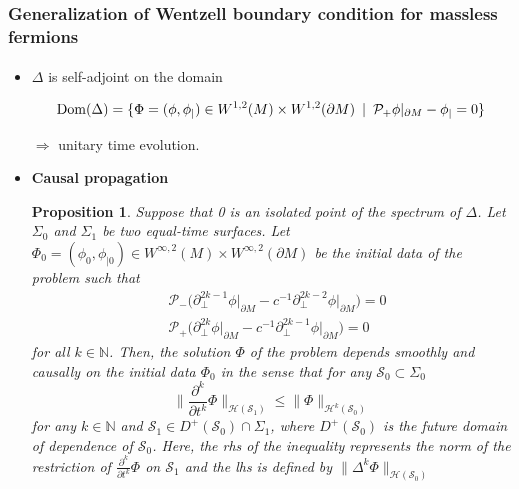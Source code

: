 \documentclass[english]{beamer}
\newcommand{\dom}{\mathrm{Dom}}
\newtheorem{proposition}{Proposition}
\begin{document}
\begin{frame}[shrink=40]
\frametitle{\small{Generalization of Wentzell boundary condition for massless fermions}}
\framesubtitle{}

\begin{itemize}

\item<1-> $\Delta$ is self-adjoint on the domain

\begin{equation*}
\dom( \Delta) = \{ \Phi = (\phi, \phi_|) \in W^{1,2}(M)\times W^{1,2}(
\partial M) \enskip | \enskip \mathcal{P}_+\phi \vert_{\partial M} - \phi_| = 0 \} 
\end{equation*}  

$\Rightarrow$ unitary time evolution.
\newline

\item<2-> \textbf{Causal propagation}\\

\begin{proposition}\label{wen-prop-causal}
Suppose that 0 is an isolated point of the spectrum of $\Delta$. 
Let $\Sigma_0$ and $\Sigma_1$ be two equal-time surfaces.
Let $\Phi_0 = (\phi_0, \phi_{|0})\in W^{\infty,2}(M)\times W^{\infty,2}(\partial M)$ be the initial data of the problem such that
\begin{equation}\label{wen-domaindeltak}
\begin{split}
& \mathcal{P}_-\big( \partial_\bot^{2k-1}\phi\vert_{\partial M} - c^{-1}\partial_\bot^{2k-2}\phi\vert_{\partial M}\big) = 0  \\
& \mathcal{P}_+\big( \partial_\bot^{2k}\phi\vert_{\partial M} - c^{-1}\partial_\bot^{2k-1}\phi\vert_{\partial M}\big) =0  
\end{split}
\end{equation}
for all $k\in\mathbb{N}$.
Then, the solution $\Phi$ of the problem depends smoothly and causally on the initial data $\Phi_0$ in the sense that for any $\mathcal{S}_0 \subset \Sigma_0$
\begin{equation}
\big\| \frac{\partial^k}{\partial t^k} \Phi\big\|_{\mathcal{H}(\mathcal{S}_1)}
\leq
\big\| \Phi\big\|_{\mathcal{H}^{k}(\mathcal{S}_0)}
\end{equation}
for any $k\in\mathbb{N}$ and $\mathcal{S}_1 \in D^+(\mathcal{S}_0)\cap\Sigma_1$, where $D^+(\mathcal{S}_0)$ is the future domain of dependence of $\mathcal{S}_0$.
Here, the rhs of the inequality represents the norm of the restriction of $\frac{\partial^k}{\partial t^k} \Phi$ on $\mathcal{S}_1$ and the lhs is defined by $\|\Delta^k \Phi\|_{\mathcal{H}(\mathcal{S}_0)}$  
\end{proposition}


\end{itemize}
\end{frame}
\end{document}

